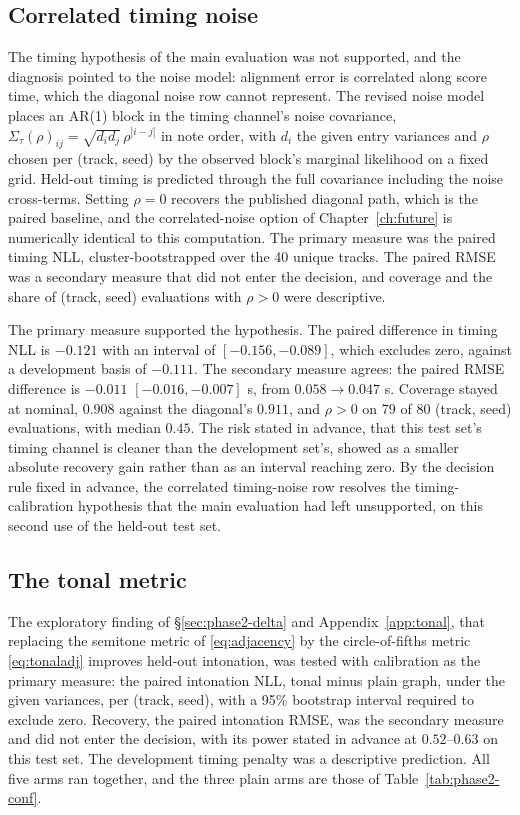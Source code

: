 \subsection{Correlated timing noise}
The timing hypothesis of the main evaluation was not supported, and the
diagnosis pointed to the noise model: alignment error is correlated along
score time, which the diagonal noise row cannot represent. The revised
noise model places an AR(1) block in the timing channel's noise
covariance, $\Sigma_{\tau}(\rho)_{ij} = \sqrt{d_i d_j}\,\rho^{|i-j|}$ in
note order, with $d_i$ the given entry variances and $\rho$ chosen per
(track, seed) by the observed block's marginal likelihood on a fixed
grid. Held-out timing is predicted through the full covariance including
the noise cross-terms. Setting $\rho = 0$ recovers the published diagonal
path, which is the paired baseline, and the correlated-noise option of
Chapter~\ref{ch:future} is numerically identical to this computation. The
primary measure was the paired timing NLL, cluster-bootstrapped over the
40 unique tracks. The paired RMSE was a secondary measure that did not
enter the decision, and coverage and the share of (track, seed)
evaluations with $\rho > 0$ were descriptive.

The primary measure supported the hypothesis. The paired difference in
timing NLL is $-0.121$ with an interval of $[-0.156, -0.089]$, which
excludes zero, against a development basis of $-0.111$. The secondary
measure agrees: the paired RMSE difference is $-0.011$
$[-0.016, -0.007]$ s, from $0.058 \to 0.047$ s. Coverage stayed at
nominal, $0.908$ against the diagonal's $0.911$, and $\rho > 0$ on 79 of
80 (track, seed) evaluations, with median $0.45$. The risk stated in
advance, that this test set's timing channel is cleaner than the
development set's, showed as a smaller absolute recovery gain rather
than as an interval reaching zero. By the decision rule fixed in advance,
the correlated timing-noise row resolves the timing-calibration
hypothesis that the main evaluation had left unsupported, on this second
use of the held-out test set.

\subsection{The tonal metric}
The exploratory finding of \S\ref{sec:phase2-delta} and
Appendix~\ref{app:tonal}, that replacing the semitone metric of
\eqref{eq:adjacency} by the circle-of-fifths metric \eqref{eq:tonaladj}
improves held-out intonation, was tested with calibration as the primary
measure: the paired intonation NLL, tonal minus plain graph, under the
given variances, per (track, seed), with a 95\% bootstrap interval
required to exclude zero. Recovery, the paired intonation RMSE, was the
secondary measure and did not enter the decision, with its power stated
in advance at $0.52$--$0.63$ on this test set. The development timing
penalty was a descriptive prediction. All five arms ran together, and
the three plain arms are those of Table~\ref{tab:phase2-conf}.

